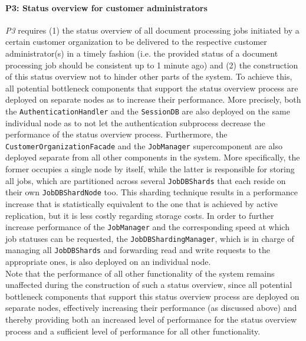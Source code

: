 \documentclass[a4paper,10pt]{article}
\begin{document}
\paragraph{P3: Status overview for customer administrators}
\textit{P3} requires (1) the status overview of all document processing jobs initiated by a certain customer organization to be delivered to the respective customer administrator(s) in a timely fashion (i.e. the provided status of a document processing job should be consistent up to 1 minute ago) and (2) the construction of this status overview not to hinder other parts of the system. To achieve this, all potential bottleneck components that support the status overview process are deployed on separate nodes as to increase their performance. More precisely, both the \texttt{AuthenticationHandler} and the \texttt{SessionDB} are also deployed on the same individual node as to not let the authentication subprocess decrease the performance of the status overview process. Furthermore, the \texttt{CustomerOrganizationFacade} and the \texttt{JobManager} supercomponent are also deployed separate from all other components in the system. More specifically, the former occupies a single node by itself, while the latter is responsible for storing all jobs, which are partitioned across several \texttt{JobDBShards} that each reside on their own \texttt{JobDBShardNode} too. This sharding technique results in a performance increase that is statistically equivalent to the one that is achieved by active replication, but it is less costly regarding storage costs. In order to further increase performance of the \texttt{JobManager} and the corresponding speed at which job statuses can be requested, the \texttt{JobDBShardingManager}, which is in charge of managing all \texttt{JobDBShards} and forwarding read and write requests to the appropriate ones, is also deployed on an individual node.\\
Note that the performance of all other functionality of the system remains unaffected during the construction of such a status overview, since all potential bottleneck components that support this status overview process are deployed on separate nodes, effectively increasing their performance (as discussed above) and thereby providing both an increased level of performance for the status overview process and a sufficient level of performance for all other functionality.\\
\end{document}
